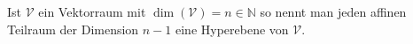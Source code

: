 Ist $\mathcal{V}$ ein Vektorraum mit $\operatorname{dim}(\mathcal{V}) = n \in \mathbb{N}$ so nennt man jeden affinen Teilraum der Dimension $n - 1$ eine Hyperebene von $\mathcal{V}$.

